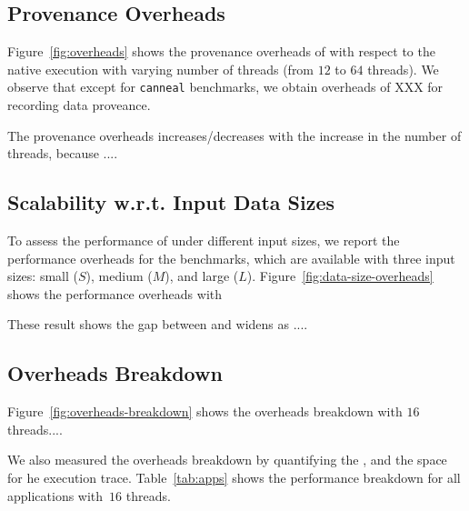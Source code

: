 \subsection{Provenance Overheads}
\label{subsec:overheads}

Figure~\ref{fig:overheads} shows the provenance overheads of \projecttitle with respect to the native \pthreads execution with varying number of
threads (from $12$ to $64$ threads). We observe that except for {\tt canneal} benchmarks, we
  obtain overheads of XXX for recording data proveance.  
  
  The provenance overheads increases/decreases with the increase in the number of
  threads, because ....



\subsection{Scalability w.r.t. Input Data Sizes}
\label{subsec:data-sizes-overheads}

To assess the performance of \projecttitle under different input sizes, we report the performance overheads for the benchmarks, which are
available with three input sizes: small ($S$), medium ($M$), and large ($L$). Figure~\ref{fig:data-size-overheads} shows the performance overheads with 

These result shows the
gap between \pthreads and \projecttitle widens as ....








\subsection{Overheads Breakdown}
\label{subsec:overheads-breakdown}

Figure~\ref{fig:overheads-breakdown} shows the overheads breakdown with $16$ threads....





We also measured the overheads breakdown by
quantifying the , and the space for he execution trace. Table~\ref{tab:apps} shows the performance breakdown for all applications  with~$16$ threads.










